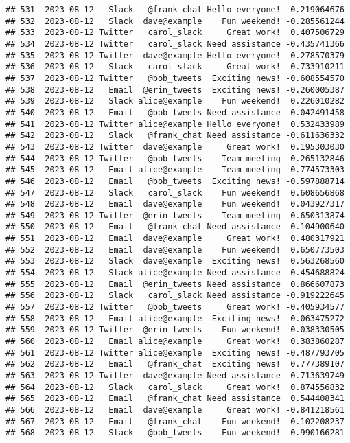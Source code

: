 \documentclass[
]{article}
\begin{document}
\begin{verbatim}
## 531  2023-08-12   Slack   @frank_chat Hello everyone! -0.219064676
## 532  2023-08-12   Slack  dave@example    Fun weekend! -0.285561244
## 533  2023-08-12 Twitter   carol_slack     Great work!  0.407506729
## 534  2023-08-12 Twitter   carol_slack Need assistance -0.435741366
## 535  2023-08-12 Twitter  dave@example Hello everyone!  0.278570379
## 536  2023-08-12   Slack   carol_slack     Great work! -0.733910211
## 537  2023-08-12 Twitter   @bob_tweets  Exciting news! -0.608554570
## 538  2023-08-12   Email  @erin_tweets  Exciting news! -0.260005387
## 539  2023-08-12   Slack alice@example    Fun weekend!  0.226010282
## 540  2023-08-12   Email   @bob_tweets Need assistance -0.042491458
## 541  2023-08-12 Twitter alice@example Hello everyone!  0.532433989
## 542  2023-08-12   Slack   @frank_chat Need assistance -0.611636332
## 543  2023-08-12 Twitter  dave@example     Great work!  0.195303030
## 544  2023-08-12 Twitter   @bob_tweets    Team meeting  0.265132846
## 545  2023-08-12   Email alice@example    Team meeting  0.774573303
## 546  2023-08-12   Email   @bob_tweets  Exciting news! -0.597888714
## 547  2023-08-12   Slack   carol_slack    Fun weekend!  0.608656868
## 548  2023-08-12   Email  dave@example    Fun weekend!  0.043927317
## 549  2023-08-12 Twitter  @erin_tweets    Team meeting  0.650313874
## 550  2023-08-12   Email   @frank_chat Need assistance -0.104900640
## 551  2023-08-12   Email  dave@example     Great work!  0.480317921
## 552  2023-08-12   Email  dave@example    Fun weekend!  0.650773503
## 553  2023-08-12   Slack  dave@example  Exciting news!  0.563268560
## 554  2023-08-12   Slack alice@example Need assistance  0.454688824
## 555  2023-08-12   Email  @erin_tweets Need assistance  0.866607873
## 556  2023-08-12   Slack   carol_slack Need assistance -0.919222645
## 557  2023-08-12 Twitter   @bob_tweets     Great work! -0.405934577
## 558  2023-08-12   Email alice@example  Exciting news!  0.063475272
## 559  2023-08-12 Twitter  @erin_tweets    Fun weekend!  0.038330505
## 560  2023-08-12   Email alice@example     Great work!  0.383860287
## 561  2023-08-12 Twitter alice@example  Exciting news! -0.487793705
## 562  2023-08-12   Email   @frank_chat  Exciting news!  0.777389107
## 563  2023-08-12 Twitter  dave@example Need assistance -0.713639749
## 564  2023-08-12   Slack   carol_slack     Great work!  0.874556832
## 565  2023-08-12   Email   @frank_chat Need assistance  0.544408341
## 566  2023-08-12   Email  dave@example     Great work! -0.841218561
## 567  2023-08-12   Email   @frank_chat    Fun weekend! -0.102208237
## 568  2023-08-12   Slack   @bob_tweets    Fun weekend!  0.990166281

\end{verbatim}
\end{document}
